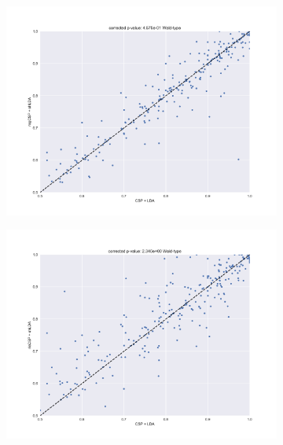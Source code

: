 \begin{figure}
    \centering
    \begin{subfigure}{0.475\textwidth}
        \includegraphics[width=\textwidth]{Figures/CSP1.pdf}
    \end{subfigure}%
    \begin{subfigure}{0.475\textwidth}
        \includegraphics[width=\textwidth]{Figures/CSP2.pdf}
    \end{subfigure}
    \begin{subfigure}{0.475\textwidth}

\end{subfigure}
\end{figure}
